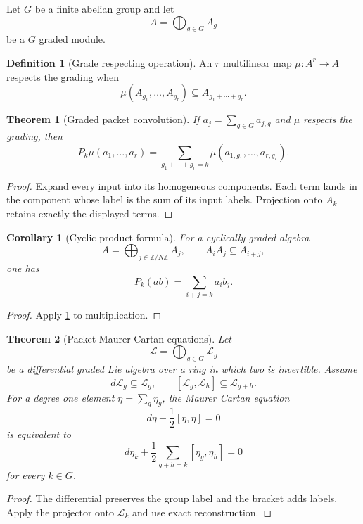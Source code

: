 \documentclass{aomart}
\newtheorem{theorem}{Theorem}[section]
\newtheorem{corollary}[corollary]{Corollary}
\theoremstyle{definition}
\newtheorem{definition}[definition]{Definition}
\theoremstyle{remark}
\newcommand{\Lcal}{\mathcal L}
\begin{document}
Let $G$ be a finite abelian group and let
\[
A=\bigoplus_{g\in G}A_g
\]
be a $G$ graded module.

\begin{definition}[Grade respecting operation]\label{def:grade_respecting}
An $r$ multilinear map $\mu:A^r\to A$ respects the grading when
\[
\mu(A_{g_1},\ldots,A_{g_r})
\subseteq
A_{g_1+\cdots+g_r}.
\]
\end{definition}

\begin{theorem}[Graded packet convolution]\label{thm:graded_convolution}
If $a_j=\sum_{g\in G}a_{j,g}$ and $\mu$ respects the grading, then
\[
P_k\mu(a_1,\ldots,a_r)
=
\sum_{g_1+\cdots+g_r=k}
\mu(a_{1,g_1},\ldots,a_{r,g_r}).
\]
\end{theorem}

\begin{proof}
Expand every input into its homogeneous components.  Each term lands in the component whose label is the sum of its input labels.  Projection onto $A_k$ retains exactly the displayed terms.
\end{proof}

\begin{corollary}[Cyclic product formula]\label{cor:cyclic_product}
For a cyclically graded algebra
\[
A=\bigoplus_{j\in\mathbb Z/N\mathbb Z}A_j,
\qquad
A_iA_j\subseteq A_{i+j},
\]
one has
\[
P_k(ab)=
\sum_{i+j=k}a_ib_j.
\]
\end{corollary}

\begin{proof}
Apply \cref{thm:graded_convolution} to multiplication.
\end{proof}

\begin{theorem}[Packet Maurer Cartan equations]\label{thm:packet_mc}
Let
\[
\Lcal=\bigoplus_{g\in G}\Lcal_g
\]
be a differential graded Lie algebra over a ring in which two is invertible.  Assume
\[
d\Lcal_g\subseteq\Lcal_g,
\qquad
[\Lcal_g,\Lcal_h]\subseteq\Lcal_{g+h}.
\]
For a degree one element $\eta=\sum_g\eta_g$, the Maurer Cartan equation
\[
d\eta+\frac12[\eta,\eta]=0
\]
is equivalent to
\[
d\eta_k
+
\frac12
\sum_{g+h=k}[\eta_g,\eta_h]
=0
\]
for every $k\in G$.
\end{theorem}

\begin{proof}
The differential preserves the group label and the bracket adds labels.  Apply the projector onto $\Lcal_k$ and use exact reconstruction.
\end{proof}
\end{document}
